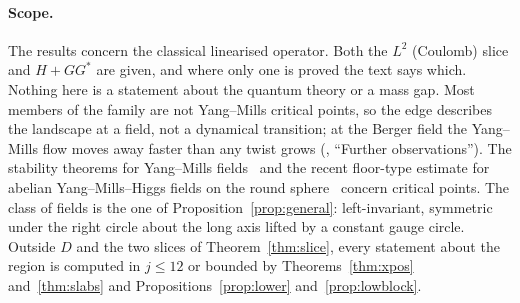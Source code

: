 \documentclass[11pt]{article}
\theoremstyle{definition}
\theoremstyle{remark}
\begin{document}
\paragraph{Scope.} The results concern the classical linearised operator. Both the $L^2$ (Coulomb) slice and $H+GG^*$
are given, and where only one is proved the text says which. Nothing here is a statement about the quantum theory or a
mass gap. Most members of the family are not Yang--Mills critical points, so the edge describes the landscape at a
field, not a dynamical transition; at the Berger field the Yang--Mills flow moves away faster than any twist grows
(\cite{davisfloor2026}, ``Further observations''). The stability theorems for Yang--Mills
fields~\cite{bl1981,ohnitapan1990,kot1986,stern2010} and the recent floor-type estimate for abelian Yang--Mills--Higgs
fields on the round sphere~\cite{jin2026} concern critical points. The class of fields is the one of
Proposition~\ref{prop:general}: left-invariant, symmetric under the right circle about the long axis lifted by a constant
gauge circle. Outside $D$ and the two slices of Theorem~\ref{thm:slice}, every statement about the region is computed in
$j\le12$ or bounded by Theorems~\ref{thm:xpos} and~\ref{thm:slabs} and Propositions~\ref{prop:lower}
and~\ref{prop:lowblock}.
\end{document}
